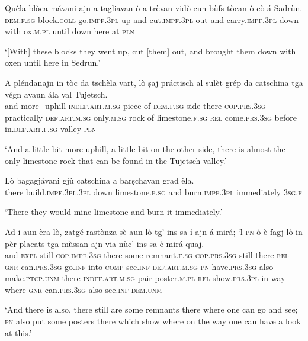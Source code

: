 \begin{linenumbers}
\gll   Quèla blòca mávani ajn a tagliavan ò a trèvan vidò cun bùfs tòcan ò cò á Sadrùn. \\
 \textsc{dem.f.sg} block.\textsc{coll} go.\textsc{impf.3pl} up and cut.\textsc{impf.3pl} out and carry.\textsc{impf.3pl} down  with ox.\textsc{m.pl} until down here at \textsc{pln}  \\
\end{linenumbers}
\medskip
\glt `[With] these blocks they went up, cut [them] out, and brought them down with oxen until here in Sedrun.'
\medskip

\begin{linenumbers}
\gll   A pléndanajn in tòc da tschèla vart, lò ṣaj práctisch al sulèt grép da catschina tga végn avaun ála val Tujetsch. \\
and more\_uphill \textsc{indef.art.m.sg} piece of \textsc{dem.f.sg} side there \textsc{cop.prs.3sg} practically \textsc{def.art.m.sg} only.\textsc{m.sg} rock of limestone.\textsc{f.sg} \textsc{rel} come.\textsc{prs.3sg} before in.\textsc{def.art.f.sg} valley \textsc{pln}   \\
\end{linenumbers}
\medskip
\glt `And a little bit more uphill, a little bit on the other side, there is almost the only limestone rock that can be found in the Tujetsch valley.'
\medskip

\begin{linenumbers}
\gll Lò bagagjávani gjù catschina a barṣchavan grad èla.   \\
there build.\textsc{impf.3pl.3pl} down limestone.\textsc{f.sg} and  burn.\textsc{impf.3pl} immediately \textsc{3sg.f}\\
\end{linenumbers}
\medskip
\glt `There they would mine limestone and burn it immediately.'
\medskip

\begin{linenumbers}
\gll Ad i aun èra lò, zatgé rastònza ṣè aun lò tg’ ins sa í ajn á mirá; `l \textsc{pn} ò è fagj\footnotemark{} lò in pèr placats tga mùssan ajn via nùc’ ins sa è mirá quaj.\\
and \textsc{expl} still \textsc{cop.impf.3sg} there some remnant.\textsc{f.sg} \textsc{cop.prs.3sg} still there \textsc{rel} \textsc{gnr} can.\textsc{prs.3sg} go.\textsc{inf} into \textsc{comp} see.\textsc{inf} \textsc{def.art.m.sg} \textsc{pn} have.\textsc{prs.3sg} also make.\textsc{ptcp.unm} there \textsc{indef.art.m.sg} pair poster.\textsc{m.pl} \textsc{rel} show.\textsc{prs.3pl} in way where \textsc{gnr} can.\textsc{prs.3sg} also see.\textsc{inf} \textsc{dem.unm} \\
\end{linenumbers}
\medskip
\glt `And there is also, there still are some remnants there where one can go and see; \textsc{pn} also put some posters there which show where on the way one can have a look at this.'
\medskip

